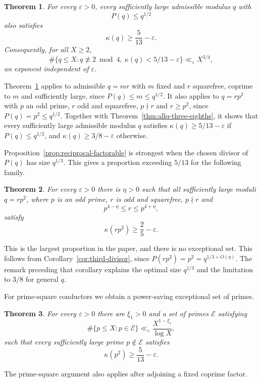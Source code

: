 \documentclass[12pt, a4paper]{amsart}
\numberwithin{equation}{section}
\newcommand{\ep}{\varepsilon}
\renewcommand{\le}{\leqslant}
\renewcommand{\ge}{\geqslant}
\theoremstyle{plain}
\newtheorem{thm}{Theorem}
\begin{document}
\begin{thm}\label{thm:density-one-main}
For every $\ep>0$, every sufficiently large admissible modulus $q$ with
$$
P(q)\le q^{1/2}
$$
also satisfies
$$
\kappa(q)\ge\frac5{13}-\ep .
$$
Consequently, for all $X\ge2$,
$$
\#\{q\le X:q\not\equiv2\bmod4,\ \kappa(q)<5/13-\ep\}\ll_\ep X^{3/4},
$$
an exponent independent of $\ep$.
\end{thm}

Theorem~\ref{thm:density-one-main} applies to admissible $q=mr$ with $m$ fixed and $r$ squarefree, coprime to $m$ and sufficiently large, since $P(q)\le m\le q^{1/2}$. It also applies to $q=rp^2$ with $p$ an odd prime, $r$ odd and squarefree, $p\nmid r$ and $r\ge p^2$, since $P(q)=p^2\le q^{1/2}$. Together with Theorem~\ref{thm:allq-three-eighths}, it shows that every sufficiently large admissible modulus $q$ satisfies $\kappa(q)\ge5/13-\ep$ if $P(q)\le q^{1/2}$, and $\kappa(q)\ge3/8-\ep$ otherwise.

Proposition~\ref{prop:reciprocal-factorable} is strongest when the chosen divisor of $P(q)$ has size $q^{1/3}$. This gives a proportion exceeding $5/13$ for the following family.

\begin{thm}\label{thm:two-fifths}
For every $\ep>0$ there is $\eta>0$ such that all sufficiently large moduli $q=rp^2$, where $p$ is an odd prime, $r$ is odd and squarefree, $p\nmid r$ and
$$
p^{4-\eta}\le r\le p^{4+\eta},
$$
satisfy
$$
\kappa(rp^2)\ge\frac25-\ep .
$$
\end{thm}

This is the largest proportion in the paper, and there is no exceptional set. This follows from Corollary~\ref{cor:third-divisor}, since $P(rp^2)=p^2=q^{1/3+O(\eta)}$. The remark preceding that corollary explains the optimal size $q^{1/3}$ and the limitation to $3/8$ for general $q$.

For prime-square conductors we obtain a power-saving exceptional set of primes.

\begin{thm}\label{thm:p2-nonvanishing}
For every $\ep>0$ there are $\xi_1>0$ and a set of primes $\mathcal E$ satisfying
$$
\#\{p\le X:p\in\mathcal E\}
\ll_\ep \frac{X^{1-\xi_1}}{\log X},
$$
such that every sufficiently large prime $p\notin\mathcal E$ satisfies
$$
\kappa(p^2)\ge \frac5{13}-\ep.
$$
\end{thm}

The prime-square argument also applies after adjoining a fixed coprime factor.
\end{document}
